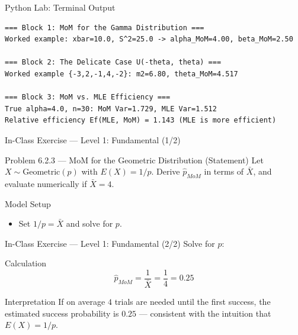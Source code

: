 \documentclass[aspectratio=169,xcolor={dvipsnames,table}]{beamer}
\begin{document}
\begin{frame}[fragile]{Python Lab: Terminal Output}
	\vspace{-0.1cm}
	\begin{block}{}
		\fontsize{4pt}{5pt}\selectfont
		\begin{verbatim}
=== Block 1: MoM for the Gamma Distribution ===
Worked example: xbar=10.0, S^2=25.0 -> alpha_MoM=4.00, beta_MoM=2.50

=== Block 2: The Delicate Case U(-theta, theta) ===
Worked example {-3,2,-1,4,-2}: m2=6.80, theta_MoM=4.517

=== Block 3: MoM vs. MLE Efficiency ===
True alpha=4.0, n=30: MoM Var=1.729, MLE Var=1.512
Relative efficiency Ef(MLE, MoM) = 1.143 (MLE is more efficient)
		\end{verbatim}
	\end{block}
\end{frame}

\begin{frame}{In-Class Exercise --- Level 1: Fundamental (1/2)}
	\vspace{-0.1cm}
	\begin{block}{Problem 6.2.3 --- MoM for the Geometric Distribution (Statement)}
		Let $X\sim\text{Geometric}(p)$ with $E(X)=1/p$. Derive $\hat p_{MoM}$ in terms of $\bar X$, and evaluate numerically if $\bar X=4$.
	\end{block}
	\vspace{0.15cm}
	\pause
	\begin{alertblock}{Model Setup}
		\begin{itemize}\itemsep=0.04cm
			\item Set $1/p = \bar X$ and solve for $p$.
		\end{itemize}
	\end{alertblock}
\end{frame}

\begin{frame}{In-Class Exercise --- Level 1: Fundamental (2/2)}
	\vspace{-0.05cm}
	\scriptsize
	Solve for $p$: \pause
	\begin{block}{Calculation}
		$$\hat p_{MoM} = \frac{1}{\bar X} = \frac{1}{4} = 0.25$$
	\end{block}
	\vspace{0.05cm}
	\pause
	\begin{alertblock}{Interpretation}
		\scriptsize
		If on average $4$ trials are needed until the first success, the estimated success probability is $0.25$ --- consistent with the intuition that $E(X)=1/p$.
	\end{alertblock}
\end{frame}
\end{document}

